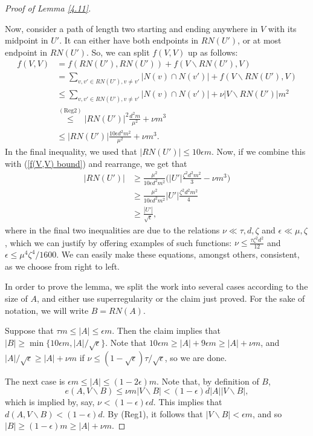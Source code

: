 \documentclass[10pt,letterpaper, reqno]{amsart}
\theoremstyle{definition}
\numberwithin{equation}{section}
\begin{document}
\begin{proof}[Proof of Lemma \ref{4.11}]
\begin{adjustwidth}{2.5em}{0pt}
		Now, consider a path of length two starting and ending anywhere in $V$ with its midpoint in $U'$. It can either have both endpoints in $RN(U')$, or at most endpoint in $RN(U')$. So, we can split $f(V,V)$ up as follows:
		\begin{align*}
		f(V,V) &= f(RN(U'), RN(U')) + f(V\backslash RN(U'), V) \\
		& = \sum_{v,v' \in RN(U'), v \neq v'} |N(v) \cap N(v')| + f(V\backslash RN(U'), V) \\
		& \leq \sum_{v,v' \in RN(U'), v \neq v'} |N(v) \cap N(v')| + \nu |V\backslash RN(U')|m^2 \\
		& \overset{\mathrm{(Reg2)}}{\leq} |RN(U')|^2 \frac{d^2m}{\mu^2} + \nu m^3 \\	
		& \leq |RN(U')|\frac{10\epsilon d^2 m^2}{\mu ^2 } + \nu m^3.	
		\end{align*} 
		In the final inequality, we used that $|RN(U')| \leq 10 \epsilon m$. Now, if we combine this with (\ref{f(V,V) bound}) and rearrange, we get that
		\begin{align*}
		|RN(U')| &\geq \frac{\mu^2}{10 \epsilon d^2 m^2} \Big(|U'|\frac{\zeta^2 d^2 m^2}{3} - \nu m^3 \Big) \\
		&\geq \frac{\mu^2}{10 \epsilon d^2 m^2} |U'| \frac{\zeta^2 d^2 m^2}{4} \\
		& \geq \frac{|U'|}{\sqrt{\epsilon}},
		\end{align*}
		where in the final two inequalities are due to the relations $\nu \ll \tau, d, \zeta$ and $\epsilon \ll \mu,\zeta$, which we can justify by offering examples of such functions: $ \nu \leq \frac{\tau \zeta^2 d^2}{12}$ and $\epsilon \leq \mu^4 \zeta ^4 /1600$. We can easily make these equations, amongst others, consistent, as we choose from right to left.
	\end{adjustwidth}
	
	\noindent In order to prove the lemma, we split the work into several cases according to the size of $A$, and either use superregularity or the claim just proved. For the sake of notation, we will write $B=RN(A)$.
	
	Suppose that $\tau m \leq |A| \leq \epsilon m$. Then the claim implies that $|B| \geq \min\{10\epsilon m, |A|/\sqrt
	\epsilon\}.$ Note that $10\epsilon m \geq |A| + 9\epsilon m \geq |A| + \nu m$, and $|A|/\sqrt{\epsilon} \geq |A| + \nu m $ if $\nu \leq (1-\sqrt{\epsilon})\tau/\sqrt{\epsilon}$, so we are done.
	
	The next case is $\epsilon m \leq |A| \leq (1-2\epsilon)m$. Note that, by definition of $B$,
	$$ e(A, V\backslash B) \leq \nu m |V \backslash B| < (1-\epsilon)d |A| |V \backslash B|,$$ which is implied by, say, $\nu < (1-\epsilon)\epsilon d$. This implies that $d(A, V\backslash B) < (1-\epsilon)d$. By (Reg1), it follows that $|V\backslash B| < \epsilon m$, and so $|B| \geq (1-\epsilon)m \geq |A| + \nu m$. 
	

\end{proof}
\end{document}
